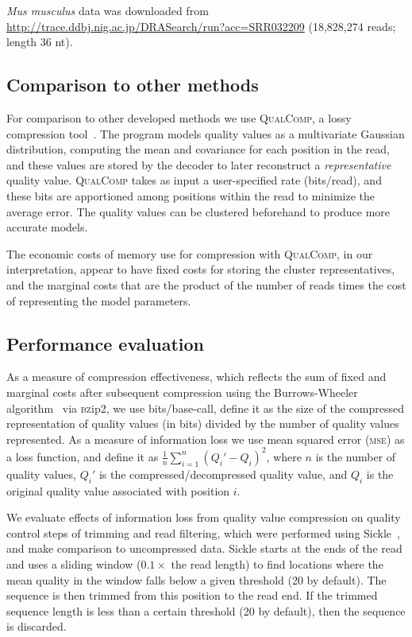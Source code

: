 \documentclass{bioinfo}
\begin{document}
\begin{methods}
\textit{Mus musculus} data was downloaded from
\url{http://trace.ddbj.nig.ac.jp/DRASearch/run?acc=SRR032209}
(18,828,274 reads; length 36 nt).

\subsection{Comparison to other methods}

For comparison to other developed methods we use \textsc{QualComp}, a
lossy compression tool~\citep{Ochoa:2013rt}. The program models
quality values as a multivariate Gaussian distribution, computing the
mean and covariance for each position in the read, and these values
are stored by the decoder to later reconstruct a \emph{representative}
quality value. \textsc{QualComp} takes as input a user-specified rate
(bits/read), and these bits are apportioned among positions within the
read to minimize the average error. The quality values can be
clustered beforehand to produce more accurate models.

The economic costs of memory use for compression with
\textsc{QualComp}, in our interpretation, appear to have fixed costs
for storing the cluster representatives, and the marginal costs that
are the product of the number of reads times the cost of representing
the model parameters.

\subsection{Performance evaluation}

As a measure of compression effectiveness, which reflects the sum of
fixed and marginal costs after subsequent compression using the
Burrows-Wheeler algorithm~\citep{bwt} via \textsc{bz}ip2, we use
bits/base-call, define it as the size of the compressed representation
of quality values (in bits) divided by the number of quality values
represented. As a measure of information loss we use mean squared
error (\textsc{mse}) as a loss function, and define it as
$\frac{1}{n}\sum_{i=1}^{n}{(Q_i'-Q_i)^2}$, where $n$ is the number of
quality values, $Q_i'$ is the compressed/decompressed quality value,
and $Q_i$ is the original quality value associated with position $i$.

We evaluate effects of information loss from quality value compression
on quality control steps of trimming and read filtering, which were
performed using Sickle~\citep{sickle}, and make comparison to
uncompressed data. Sickle starts at the ends of the read and uses a
sliding window ($0.1 \times$ the read length) to find locations where
the mean quality in the window falls below a given threshold (20 by
default). The sequence is then trimmed from this position to the read
end. If the trimmed sequence length is less than a certain threshold
(20 by default), then the sequence is discarded.


\end{methods}
\end{document}
